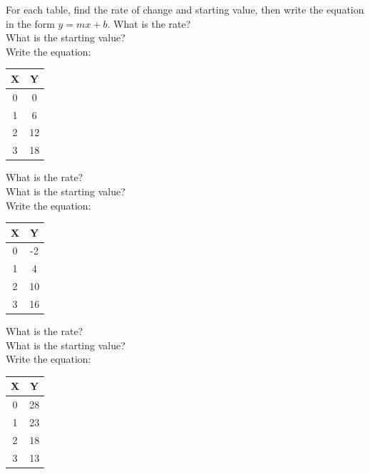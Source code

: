\documentclass[10pt]{article}
\theoremstyle{definition}
\theoremstyle{plain}
\numberwithin{equation}{section}
\begin{document}
\begin{multicolblock}{For each table, find the rate of change and starting value, then write the equation in the form $y=mx+b$.}
What is the rate? \underline{\hspace{2cm}} \\
What is the starting value? \underline{\hspace{2cm}} \\
Write the equation: \underline{\hspace{4cm}}

\begin{center}
  
\begin{tabular}{|c|c|}
\hline X & Y \\
\hline 0 & 0 \\
\hline 1 & 6 \\
\hline 2 & 12 \\
\hline 3 & 18 \\
\hline
\end{tabular}

\end{center}

What is the rate? \underline{\hspace{2cm}} \\
What is the starting value? \underline{\hspace{2cm}} \\
Write the equation: \underline{\hspace{4cm}}


\begin{center}
  
\begin{tabular}{|c|c|}
\hline X & Y \\
\hline 0 & -2 \\
\hline 1 & 4 \\
\hline 2 & 10 \\
\hline 3 & 16 \\
\hline
\end{tabular}
\end{center}

What is the rate? \underline{\hspace{2cm}} \\
What is the starting value? \underline{\hspace{2cm}} \\
Write the equation: \underline{\hspace{4cm}}

\begin{center}
\begin{tabular}{|c|c|}
\hline X & Y \\
\hline 0 & 28 \\
\hline 1 & 23 \\
\hline 2 & 18 \\
\hline 3 & 13 \\
\hline
\end{tabular}
  

\end{center}
\end{multicolblock}
\end{document}
